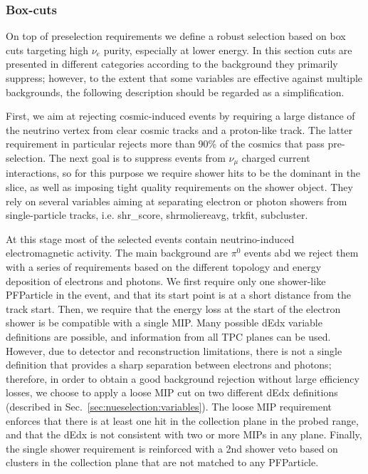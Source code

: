 \documentclass[a4paper]{article}
\begin{document}
\subsubsection{Box-cuts}

On top of preselection requirements we define a robust selection based on box cuts targeting high $\nu_e$ purity, especially at lower energy.
In this section cuts are presented in different categories according to the background they primarily suppress; however, to the extent that some variables are effective against multiple backgrounds, the following description should be regarded as a simplification.

First, we aim at rejecting cosmic-induced events by requiring a large distance of the neutrino vertex from clear cosmic tracks and a proton-like track. The latter requirement in particular rejects more than 90\% of the cosmics that pass pre-selection. The next goal is to suppress events from $\nu_\mu$ charged current interactions, so for this purpose we require shower hits to be the dominant in the slice, as well as imposing tight quality requirements on the shower object. They rely on several variables aiming at separating electron or photon showers from single-particle tracks, i.e. shr\_score, shrmoliereavg, trkfit, subcluster. 

At this stage most of the selected events contain neutrino-induced electromagnetic activity. The main background are $\pi^0$ events abd we reject them with a series of requirements based on the different topology and energy deposition of electrons and photons. We first require only one shower-like PFParticle in the event, and that its start point is at a short distance from the track start. Then, we require that the energy loss at the start of the electron shower is be compatible with a single MIP. Many possible dEdx variable definitions are possible, and information from all TPC planes can be used. However, due to detector and reconstruction limitations, there is not a single definition that provides a sharp separation between electrons and photons; therefore, in order to obtain a good background rejection without large efficiency losses, we choose to apply a loose MIP cut on two different dEdx definitions (described in Sec.~\ref{sec:nueselection:variables}). The loose MIP requirement enforces that there is at least one hit in the collection plane in the probed range, and that the dEdx is not consistent with two or more MIPs in any plane. Finally, the single shower requirement is reinforced with a 2nd shower veto based on clusters in the collection plane that are not matched to any PFParticle.
\end{document}

